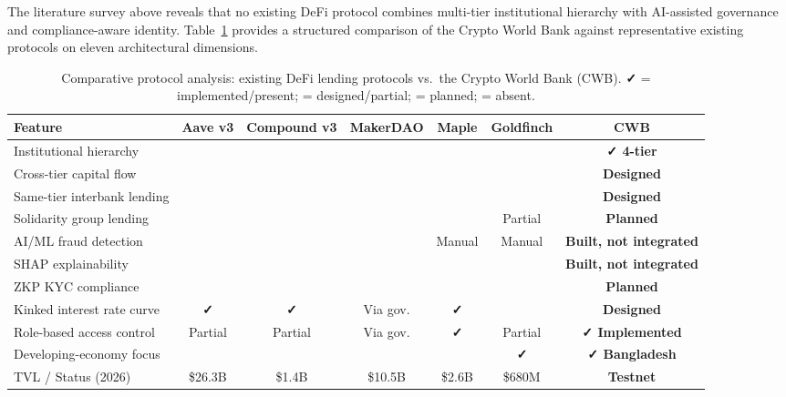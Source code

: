 \documentclass[12pt,a4paper]{report}
\newcommand{\tmarkDone}{\textbf{\faCheck}}
\newcommand{\tmarkNo}{\textbf{\faTimes}}
\newcommand{\tmarkPartial}{\faHourglassHalf}
\newcommand{\tmarkPlanned}{\textcolor{black!55}{\faCircle}}
\newcommand{\tableheadcolor}{\rowcolor{black!8}}
\newcommand{\tableheadfont}{\bfseries\small}
\begin{document}
The literature survey above reveals that no existing DeFi protocol combines multi-tier institutional hierarchy with AI-assisted governance and compliance-aware identity. Table~\ref{tab:protocol-comparison} provides a structured comparison of the Crypto World Bank against representative existing protocols on eleven architectural dimensions.

\begin{table}[H]
\centering
\caption{Comparative protocol analysis: existing DeFi lending protocols vs.\ the Crypto World Bank (CWB). {\normalfont \tmarkDone{} = implemented/present; \tmarkPartial{} = designed/partial; \tmarkPlanned{} = planned; \tmarkNo{} = absent.}}
\label{tab:protocol-comparison}
\renewcommand{\arraystretch}{1.25}
\small
\begin{tabular}{@{}p{4.2cm}ccccc>{\bfseries}c@{}}
\toprule
\tableheadcolor
\tableheadfont Feature & \tableheadfont Aave v3 & \tableheadfont Compound v3 & \tableheadfont MakerDAO & \tableheadfont Maple & \tableheadfont Goldfinch & \tableheadfont CWB \\
\midrule
Institutional hierarchy & \tmarkNo{} & \tmarkNo{} & \tmarkNo{} & \tmarkNo{} & \tmarkNo{} & \tmarkDone{} 4-tier \\
\rowcolor{RowShade}
Cross-tier capital flow & \tmarkNo{} & \tmarkNo{} & \tmarkNo{} & \tmarkNo{} & \tmarkNo{} & \tmarkPartial{} Designed \\
Same-tier interbank lending & \tmarkNo{} & \tmarkNo{} & \tmarkNo{} & \tmarkNo{} & \tmarkNo{} & \tmarkPartial{} Designed \\
\rowcolor{RowShade}
Solidarity group lending & \tmarkNo{} & \tmarkNo{} & \tmarkNo{} & \tmarkNo{} & Partial & \tmarkPlanned{} Planned \\
AI/ML fraud detection & \tmarkNo{} & \tmarkNo{} & \tmarkNo{} & Manual & Manual & \tmarkPartial{} Built, not integrated \\
\rowcolor{RowShade}
SHAP explainability & \tmarkNo{} & \tmarkNo{} & \tmarkNo{} & \tmarkNo{} & \tmarkNo{} & \tmarkPartial{} Built, not integrated \\
ZKP KYC compliance & \tmarkNo{} & \tmarkNo{} & \tmarkNo{} & \tmarkNo{} & \tmarkNo{} & \tmarkPlanned{} Planned \\
\rowcolor{RowShade}
Kinked interest rate curve & \tmarkDone{} & \tmarkDone{} & Via gov. & \tmarkDone{} & \tmarkNo{} & \tmarkPartial{} Designed \\
Role-based access control & Partial & Partial & Via gov. & \tmarkDone{} & Partial & \tmarkDone{} Implemented \\
\rowcolor{RowShade}
Developing-economy focus & \tmarkNo{} & \tmarkNo{} & \tmarkNo{} & \tmarkNo{} & \tmarkDone{} & \tmarkDone{} Bangladesh \\
TVL / Status (2026) & \$26.3B & \$1.4B & \$10.5B & \$2.6B & \$680M & Testnet \\
\bottomrule
\end{tabular}
\end{table}
\end{document}
